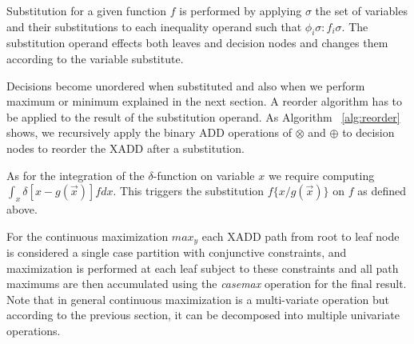 \documentclass[twoside,11pt]{article}
\begin{document}
Substitution for a given function $f$ is performed by applying $\sigma$ the set of variables and their substitutions to each inequality operand such that $\phi_i\sigma: f_i\sigma$. The substitution operand effects both leaves and decision nodes and changes them according to the variable substitute. 

Decisions become unordered when substituted and also when we perform maximum or minimum explained in the next section. A reorder algorithm has to be applied to the result of the substitution operand. As Algorithm ~\ref{alg:reorder} shows, we recursively apply the binary ADD operations of $\otimes$ and $\oplus$ to decision nodes to reorder the XADD after a substitution. 

As for the integration of the $\delta$-function on variable $x$ we require computing $\int_{x} \delta [ x - g(\vec{x})]fdx$. This triggers the substitution $f \lbrace x/ g(\vec{x})\rbrace$ on $f$ as defined above.  

For the continuous maximization $max_y$ each XADD path from root to leaf node is considered a single case partition with conjunctive constraints, and maximization is performed at each leaf subject to these constraints and all path maximums are then accumulated using the \textit{casemax} operation for the final result. Note that in general continuous maximization is a multi-variate operation but according to the previous section, it can be decomposed into multiple univariate operations. 
\end{document}
